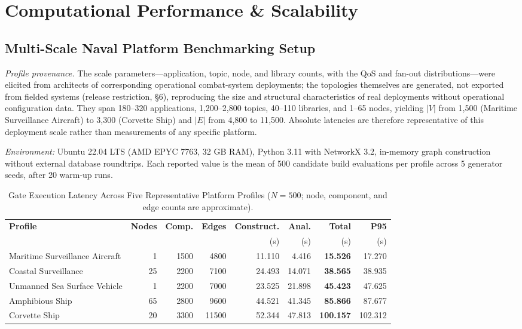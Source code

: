 \documentclass[sigconf,9pt]{acmart}
\begin{document}
\section{Computational Performance \& Scalability}

\subsection{Multi-Scale Naval Platform Benchmarking Setup}

\noindent\emph{Profile provenance.} The scale parameters---application, topic, node, and library counts, with the QoS and fan-out distributions---were elicited from architects of corresponding operational combat-system deployments; the topologies themselves are generated, not exported from fielded systems (release restriction, \S6), reproducing the size and structural characteristics of real deployments without operational configuration data. They span 180--320 applications, 1{,}200--2{,}800 topics, 40--110 libraries, and 1--65 nodes, yielding $|V|$ from 1{,}500 (Maritime Surveillance Aircraft) to 3{,}300 (Corvette Ship) and $|E|$ from 4{,}800 to 11{,}500. Absolute latencies are therefore representative of this deployment scale rather than measurements of any specific platform.

\noindent\emph{Environment:} Ubuntu 22.04 LTS (AMD EPYC 7763, 32 GB RAM), Python 3.11 with NetworkX 3.2, in-memory graph construction without external database roundtrips. Each reported value is the mean of 500 candidate build evaluations per profile across 5 generator seeds, after 20 warm-up runs.

\begin{table}[b] \centering \caption{Gate Execution Latency Across Five Representative Platform Profiles ($N=500$; node, component, and edge counts are approximate).} \label{tab:latency} \small \setlength{\tabcolsep}{2.2pt} \begin{tabularx}{\columnwidth}{X r r r r r r r} \toprule \textbf{Profile} & \textbf{Nodes} & \textbf{Comp.} & \textbf{Edges} & \textbf{Construct.} & \textbf{Anal.} & \textbf{Total} & \textbf{P95} \\ & & & & (s) & (s) & (s) & (s) \\ \midrule Maritime Surveillance Aircraft & 1 & 1500 & 4800 & 11.110 & 4.416 & \textbf{15.526} & 17.270 \\ Coastal Surveillance & 25 & 2200 & 7100 & 24.493 & 14.071 & \textbf{38.565} & 38.935 \\ Unmanned Sea Surface Vehicle & 1 & 2200 & 7000 & 23.525 & 21.898 & \textbf{45.423} & 47.625 \\ Amphibious Ship & 65 & 2800 & 9600 & 44.521 & 41.345 & \textbf{85.866} & 87.677 \\ Corvette Ship & 20 & 3300 & 11500 & 52.344 & 47.813 & \textbf{100.157} & 102.312 \\ \bottomrule \end{tabularx} \end{table}
\end{document}
